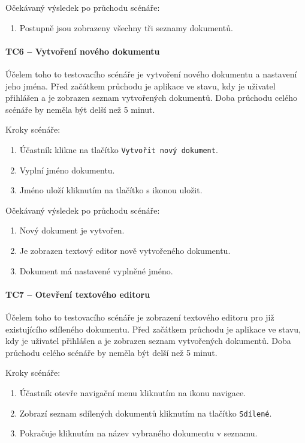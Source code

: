 Očekávaný výsledek po průchodu scénáře:
\begin{enumerate}
    \item Postupně jsou zobrazeny všechny tři seznamy dokumentů.
\end{enumerate}


\paragraph{TC6 -- Vytvoření nového dokumentu}

Účelem toho to testovacího scénáře je vytvoření nového dokumentu a nastavení jeho jména.
Před začátkem průchodu je aplikace ve stavu, kdy je uživatel přihlášen a je zobrazen seznam vytvořených dokumentů.
Doba průchodu celého scénáře by neměla být delší než 5 minut.

Kroky scénáře:
\begin{enumerate}
    \item Účastník klikne na tlačítko \texttt{Vytvořit nový dokument}.
    \item Vyplní jméno dokumentu.
    \item Jméno uloží kliknutím na tlačítko s ikonou uložit.
\end{enumerate}

Očekávaný výsledek po průchodu scénáře:
\begin{enumerate}
    \item Nový dokument je vytvořen.
    \item Je zobrazen textový editor nově vytvořeného dokumentu.
    \item Dokument má nastavené vyplněné jméno.
\end{enumerate}

\paragraph{TC7 -- Otevření textového editoru}

Účelem toho to testovacího scénáře je zobrazení textového editoru pro již existujícího sdíleného dokumentu.
Před začátkem průchodu je aplikace ve stavu, kdy je uživatel přihlášen a je zobrazen seznam vytvořených dokumentů.
Doba průchodu celého scénáře by neměla být delší než 5 minut.

Kroky scénáře:
\begin{enumerate}
    \item Účastník otevře navigační menu kliknutím na ikonu navigace.
    \item Zobrazí seznam sdílených dokumentů kliknutím na tlačítko \texttt{Sdílené}.
    \item Pokračuje kliknutím na název vybraného dokumentu v seznamu.
\end{enumerate}

